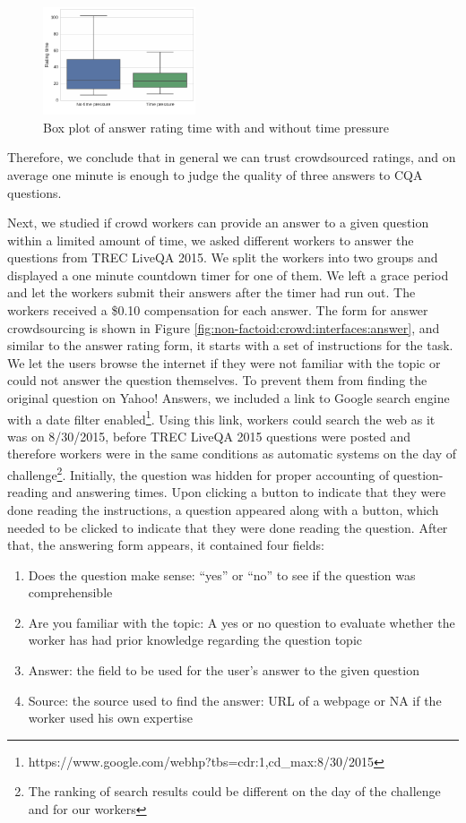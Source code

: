 \begin{figure}[t!]
	\centering
	\includegraphics[width=0.4\textwidth]{img/validation_time}
	\caption{Box plot of answer rating time with and without time pressure}
	\label{figure:validation_time}
\end{figure}

Therefore, we conclude that in general we can trust crowdsourced ratings, and on average one minute is enough to judge the quality of three answers to CQA questions.

Next, we studied if crowd workers can provide an answer to a given question within a limited amount of time, we asked different workers to answer the questions from TREC LiveQA 2015.
We split the workers into two groups and displayed a one minute countdown timer for one of them.
We left a grace period and let the workers submit their answers after the timer had run out.
The workers received a \$0.10 compensation for each answer.
The form for answer crowdsourcing is shown in Figure \ref{fig:non-factoid:crowd:interfaces:answer}, and similar to the answer rating form, it starts with a set of instructions for the task.
We let the users browse the internet if they were not familiar with the topic or could not answer the question themselves.
To prevent them from finding the original question on Yahoo! Answers, we included a link to Google search engine with a date filter enabled\footnote{https://www.google.com/webhp?tbs=cdr:1,cd\_max:8/30/2015}.
Using this link, workers could search the web as it was on 8/30/2015, before TREC LiveQA 2015 questions were posted and therefore workers were in the same conditions as automatic systems on the day of challenge\footnote{The ranking of search results could be different on the day of the challenge and for our workers}.
Initially, the question was hidden for proper accounting of question-reading and answering times.
Upon clicking a button to indicate that they were done reading the instructions, a question appeared along with a button, which needed to be clicked to indicate that they were done reading the question.
After that, the answering form appears, it contained four fields:
\begin{enumerate}
\setlength{\itemsep}{0pt}
\setlength{\parskip}{0pt}
\item Does the question make sense: ``yes'' or ``no'' to see if the question was comprehensible
\item Are you familiar with the topic: A yes or no question to evaluate whether the worker has had prior knowledge regarding the question topic
\item Answer: the field to be used for the user's answer to the given question
\item Source: the source used to find the answer: URL of a webpage or NA if the worker used his own expertise
\end{enumerate}

